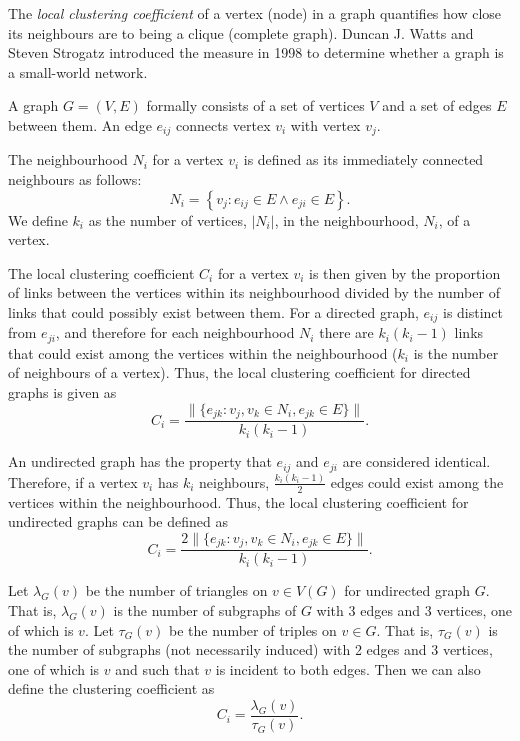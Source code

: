         The \emph{local clustering coefficient} of a vertex (node) in a graph quantifies how close its neighbours are to being a clique (complete graph). Duncan J. Watts and Steven Strogatz introduced the measure in 1998 to determine whether a graph is a small-world network.
              
        A graph $G=(V,E)$ formally consists of a set of vertices $V$ and a set of edges $E$ between them. An edge $e_{ij}$ connects vertex $v_i$ with vertex $v_j$.

        The neighbourhood $N_i$ for a vertex $v_i$ is defined as its immediately connected neighbours as follows:
        \begin{equation}
          N_i = \left\{v_j: e_{ij} \in E \wedge e_{ji} \in E\right\} \mbox{.}
        \end{equation}
        We define $k_i$ as the number of vertices, $|N_i|$, in the neighbourhood, $N_i$, of a vertex.

        The local clustering coefficient $C_i$ for a vertex $v_i$ is then given by the proportion of links between the vertices within its neighbourhood divided by the number of links that could possibly exist between them. For a directed graph, $e_{ij}$ is distinct from $e_{ji}$, and therefore for each neighbourhood $N_i$ there are $k_i(k_i-1)$ links that could exist among the vertices within the neighbourhood ($k_i$ is the number of neighbours of a vertex). Thus, the local clustering coefficient for directed graphs is given as \cite{WattsStrogatz1998}
        \begin{equation}
          C_i = \frac{\|\{e_{jk}: v_j,v_k \in N_i, e_{jk} \in E\}\|}{k_i(k_i-1)} \mbox{.}
        \end{equation}
    
        An undirected graph has the property that $e_{ij}$ and $e_{ji}$ are considered identical. Therefore, if a vertex $v_i$ has $k_i$ neighbours, $\frac{k_i(k_i-1)}{2}$ edges could exist among the vertices within the neighbourhood. Thus, the local clustering coefficient for undirected graphs can be defined as
        \begin{equation}
          C_i = \frac{2\|\{e_{jk}: v_j,v_k \in N_i, e_{jk} \in E\}\|}{k_i(k_i-1)} \mbox{.}
        \end{equation}

        Let $\lambda_G(v)$ be the number of triangles on $v \in V(G)$ for undirected graph $G$. That is, $\lambda_G(v)$ is the number of subgraphs of $G$ with 3 edges and 3 vertices, one of which is $v$. Let $\tau_G(v)$ be the number of triples on $v \in G$. That is, $\tau_G(v)$ is the number of subgraphs (not necessarily induced) with 2 edges and 3 vertices, one of which is $v$ and such that $v$ is incident to both edges. Then we can also define the clustering coefficient as
        \begin{equation}
          C_i = \frac{\lambda_G(v)}{\tau_G(v)} \mbox{.}
        \end{equation}

